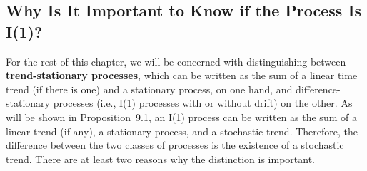 \subsection*{Why Is It Important to Know if the Process Is I(1)?}

For the rest of this chapter, we will be concerned with distinguishing between
\textbf{trend-stationary processes}, which can be written as the sum of a linear time trend
(if there is one) and a stationary process, on one hand, and difference-stationary
processes (i.e., I(1) processes with or without drift) on the other. As will be shown
in Proposition~9.1, an I(1) process can be written as the sum of a linear trend (if
any), a stationary process, and a stochastic trend. Therefore, the difference between
the two classes of processes is the existence of a stochastic trend. There are at least
two reasons why the distinction is important.

